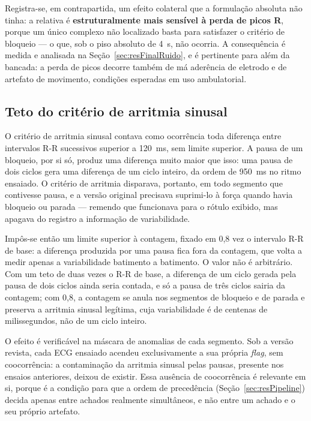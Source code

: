 Registra-se, em contrapartida, um efeito colateral que a formulação absoluta não tinha: a
relativa é \textbf{estruturalmente mais sensível à perda de picos R}, porque um único
complexo não localizado basta para satisfazer o critério de bloqueio --- o que, sob o piso
absoluto de 4~s, não ocorria. A consequência é medida e analisada na
Seção~\ref{sec:resFinalRuido}, e é pertinente para além da bancada: a perda de picos decorre
também de má aderência de eletrodo e de artefato de movimento, condições esperadas em uso
ambulatorial.

\subsection{Teto do critério de arritmia sinusal}
\label{sec:resTetoArritmia}

O critério de arritmia sinusal contava como ocorrência toda diferença entre intervalos R-R
sucessivos superior a 120~ms, sem limite superior. A pausa de um bloqueio, por si só,
produz uma diferença muito maior que isso: uma pausa de dois ciclos gera uma diferença de um
ciclo inteiro, da ordem de 950~ms no ritmo ensaiado. O critério de arritmia disparava,
portanto, em todo segmento que contivesse pausa, e a versão original precisava suprimi-lo à
força quando havia bloqueio ou parada --- remendo que funcionava para o rótulo exibido, mas
apagava do registro a informação de variabilidade.

Impôs-se então um limite superior à contagem, fixado em 0,8 vez o intervalo R-R de base: a
diferença produzida por uma pausa fica fora da contagem, que volta a medir apenas a
variabilidade batimento a batimento. O valor não é arbitrário. Com um teto de duas vezes o
R-R de base, a diferença de um ciclo gerada pela pausa de dois ciclos ainda seria contada, e
só a pausa de três ciclos sairia da contagem; com 0,8, a contagem se anula nos segmentos de
bloqueio e de parada e preserva a arritmia sinusal legítima, cuja variabilidade é de
centenas de milissegundos, não de um ciclo inteiro.

O efeito é verificável na máscara de anomalias de cada segmento. Sob a versão revista, cada
\acs{ECG} ensaiado acendeu exclusivamente a sua própria \textit{flag}, sem coocorrência: a
contaminação da arritmia sinusal pelas pausas, presente nos ensaios anteriores, deixou de
existir. Essa ausência de coocorrência é relevante em si, porque é a condição para que a
ordem de precedência (Seção~\ref{sec:resPipeline}) decida apenas entre achados realmente
simultâneos, e não entre um achado e o seu próprio artefato.

